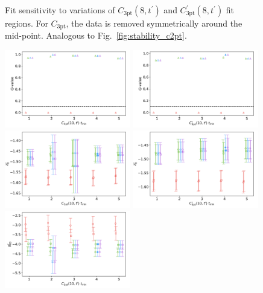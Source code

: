 \documentclass[prd,aps,twocolumn,superscriptaddress,tightenlines,nofootinbib,floatfix,preprintnumbers,10pt]{revtex4-1}
\begin{document}
\begin{figure}[h]
{		\caption{
			Fit sensitivity to variations of $C_{\mathrm{3pt}}(8,t^\prime)$ and $C^\prime_{\mathrm{3pt}}(8,t^\prime)$ fit regions. For $C_{\mathrm{3pt}}$, the data is removed symmetrically around the mid-point. Analogous to Fig.~\ref{fig:stability_c2pt}.}
		\label{fig:stability_c3pt8}
}\end{figure}

\newpage
\begin{figure}[h]{
		\includegraphics[width=0.49\textwidth]{plots/figures/gV10_Q.pdf}
		\includegraphics[width=0.49\textwidth]{plots/figures/dgV10_Q.pdf}
		\includegraphics[width=0.49\textwidth]{plots/figures/gV10_dZ0.pdf}
		\includegraphics[width=0.49\textwidth]{plots/figures/dgV10_dZ0.pdf}
		\includegraphics[width=0.49\textwidth]{plots/figures/gV10_dgV.pdf}
}
\end{figure}
\end{document}
